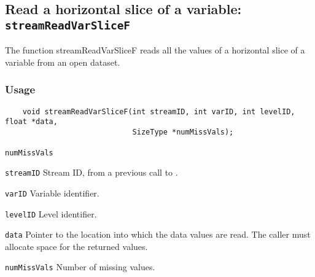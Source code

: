 \subsection{Read a horizontal slice of a variable: \texttt{streamReadVarSliceF}}
\label{streamReadVarSliceF}

The function streamReadVarSliceF reads all the values of a horizontal slice of a variable
from an open dataset.
\subsubsection*{Usage}

\begin{verbatim}
    void streamReadVarSliceF(int streamID, int varID, int levelID, float *data, 
                             SizeType *numMissVals);
\end{verbatim}

\hspace*{4mm}\begin{minipage}[]{15cm}
\begin{deflist}{\texttt{numMissVals}\ }
\item[\texttt{streamID}]
Stream ID, from a previous call to {}.
\item[\texttt{varID}]
Variable identifier.
\item[\texttt{levelID}]
Level identifier.
\item[\texttt{data}]
Pointer to the location into which the data values are read.
                     The caller must allocate space for the returned values.
\item[\texttt{numMissVals}]
Number of missing values.

\end{deflist}
\end{minipage}
